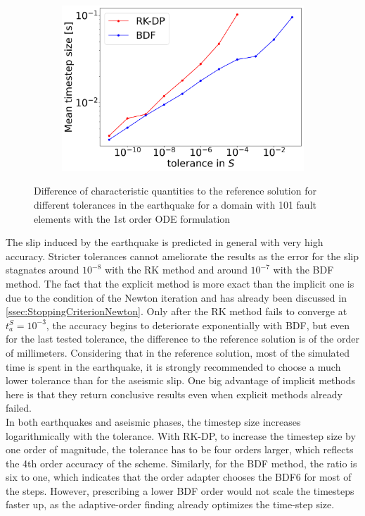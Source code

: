 \begin{figure}[H]
\begin{subfigure}[t]{0.32\textwidth}
		\includegraphics[width=1\textwidth]{images/TANDEMcompactODEDifferentTolerancesSize101_EQ_DT.png}
	\end{subfigure}
	\caption{Difference of characteristic quantities to the reference solution for different tolerances in the earthquake for a domain with 101 fault elements with the 1st order ODE formulation}
	\label{fig:tolerancesEarthquake_compactODE}
\end{figure}
The slip induced by the earthquake is predicted in general with very high accuracy. Stricter tolerances cannot ameliorate the results as the error for the slip stagnates around $10^{-8}$ with the RK method and around $10^{-7}$ with the BDF method. The fact that the explicit method is more exact than the implicit one is due to the condition of the Newton iteration and has already been discussed in \autoref{ssec:StoppingCriterionNewton}. Only after the RK method fails to converge at $t_a^S = 10^{-3}$, the accuracy begins to deteriorate exponentially with BDF, but even for the last tested tolerance, the difference to the reference solution is of the order of millimeters. Considering that in the reference solution, most of the simulated time is spent in the earthquake, it is strongly recommended to choose a much lower tolerance than for the aseismic slip. One big advantage of implicit methods here is that they return conclusive results even when explicit methods already failed. \\

In both earthquakes and aseismic phases, the timestep size increases logarithmically with the tolerance. With RK-DP, to increase the timestep size by one order of magnitude, the tolerance has to be four orders larger, which reflects the 4th order accuracy of the scheme. Similarly, for the BDF method, the ratio is six to one, which indicates that the order adapter chooses the BDF6 for most of the steps. However, prescribing a lower BDF order would not scale the timesteps faster up, as the adaptive-order finding already optimizes the time-step size. \\

